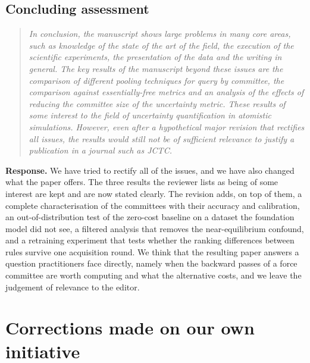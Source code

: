 \documentclass[11pt]{article}
\newcommand{\rpoint}[1]{\begin{quote}\itshape #1\end{quote}}
\newcommand{\response}{\medskip\noindent\textbf{Response.} }
\begin{document}
\subsection*{Concluding assessment}
\rpoint{In conclusion, the manuscript shows large problems in many core areas,
such as knowledge of the state of the art of the field, the execution of the
scientific experiments, the presentation of the data and the writing in
general. The key results of the manuscript beyond these issues are the
comparison of different pooling techniques for query by committee, the
comparison against essentially-free metrics and an analysis of the effects
of reducing the committee size of the uncertainty metric. These results of
some interest to the field of uncertainty quantification in atomistic
simulations. However, even after a hypothetical major revision that rectifies
all issues, the results would still not be of sufficient relevance to justify
a publication in a journal such as JCTC.}

\response
We have tried to rectify all of the issues, and we have also changed what the
paper offers. The three results the reviewer lists as being of some interest
are kept and are now stated clearly. The revision adds, on top of them, a
complete characterisation of the committees with their accuracy and
calibration, an out-of-distribution test of the zero-cost baseline on a
dataset the foundation model did not see, a filtered analysis that removes
the near-equilibrium confound, and a retraining experiment that tests whether
the ranking differences between rules survive one acquisition round. We
think that the resulting paper answers a question practitioners face
directly, namely when the backward passes of a force committee are worth
computing and what the alternative costs, and we leave the judgement of
relevance to the editor.

\section*{Corrections made on our own initiative}
\end{document}
